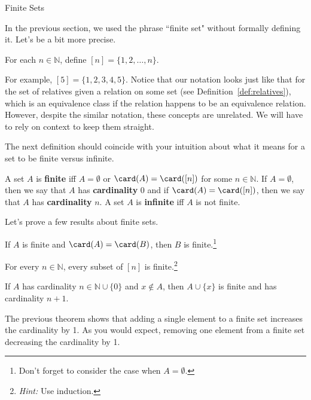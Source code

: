 \begin{section}{Finite Sets}

In the previous section, we used the phrase ``finite set" without formally defining it. Let's be a bit more precise.

\begin{definition}
For each $n\in \mathbb{N}$, define $[n]=\{1,2,\ldots,n\}$.
\end{definition}

For example, $[5]=\{1,2,3,4,5\}$.  Notice that our notation looks just like that for the set of relatives given a relation on some set (see Definition~\ref{def:relatives}), which is an equivalence class if the relation happens to be an equivalence relation.  However, despite the similar notation, these concepts are unrelated. We will have to rely on context to keep them straight.

The next definition should coincide with your intuition about what it means for a set to be finite versus infinite.

\begin{definition}
A set $A$ is \textbf{finite} iff $A=\emptyset$ or $\card(A)=\card([n])$ for some $n\in\mathbb{N}$. If $A=\emptyset$, then we say that $A$ has \textbf{cardinality} 0 and if $\card(A)=\card([n])$, then we say that $A$ has \textbf{cardinality} $n$. A set $A$ is \textbf{infinite} iff $A$ is not finite.
\end{definition}

Let's prove a few results about finite sets.

\begin{theorem}
If $A$ is finite and $\card(A)=\card(B)$, then $B$ is finite.\footnote{Don't forget to consider the case when $A=\emptyset$.}
\end{theorem}

\begin{theorem}\label{thm:subsetsFiniteSets}
For every $n\in\mathbb{N}$, every subset of $[n]$ is finite.\footnote{\emph{Hint:} Use induction.}
\end{theorem}

\begin{theorem}\label{thm:increaseCardinality}
If $A$ has cardinality $n\in\mathbb{N}\cup\{0\}$ and $x\notin A$, then $A\cup\{x\}$ is finite and has cardinality $n+1$.
\end{theorem}

The previous theorem shows that adding a single element to a finite set increases the cardinality by 1. As you would expect, removing one element from a finite set decreasing the cardinality by 1.


\end{section}
